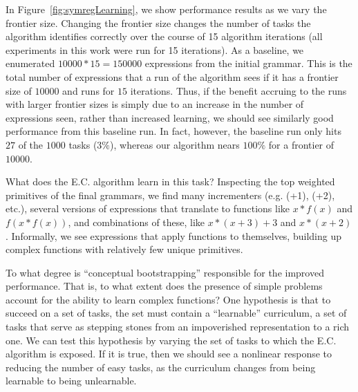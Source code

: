 \documentclass{article}
\begin{document}


In Figure~\ref{fig:symregLearning}, we show performance results as we
vary the frontier size. Changing the frontier size changes the number
of tasks the algorithm identifies correctly over the course of 15
algorithm iterations (all experiments in this work were run for 15
iterations). As a baseline, we enumerated $10000*15=150000$
expressions from the initial grammar. This is the total number of
expressions that a run of the algorithm sees if it has a frontier size
of $10000$ and runs for $15$ iterations. Thus, if the benefit accruing
to the runs with larger frontier sizes is simply due to an increase in
the number of expressions seen, rather than increased learning, we
should see similarly good performance from this baseline run. In fact,
however, the baseline run only hits $27$ of the $1000$ tasks ($3\%$),
whereas our algorithm nears $100\%$ for a frontier of $10000$.

What does the E.C. algorithm learn in this task?  Inspecting the top
weighted primitives of the final grammars, we find many incrementers
(e.g. (+1), (+2), etc.), several versions of expressions that
translate to functions like $x*f(x)$ and $f(x*f(x))$, and combinations
of these, like $x*(x+3)+3$ and $x*(x+2)$. Informally, we see
expressions that apply functions to themselves, building up complex
functions with relatively few unique primitives. 

To what degree is ``conceptual bootstrapping'' responsible for the
improved performance. That is, to what extent does the presence of
simple problems account for the ability to learn complex functions?
One hypothesis is that to succeed on a set of tasks, the set must
contain a ``learnable'' curriculum, a set of tasks that serve as
stepping stones from an impoverished representation to a rich one. We
can test this hypothesis by varying the set of tasks to which the E.C.
algorithm is exposed. If it is true, then we should see a nonlinear
response to reducing the number of easy tasks, as the curriculum
changes from being learnable to being unlearnable.
\end{document}
